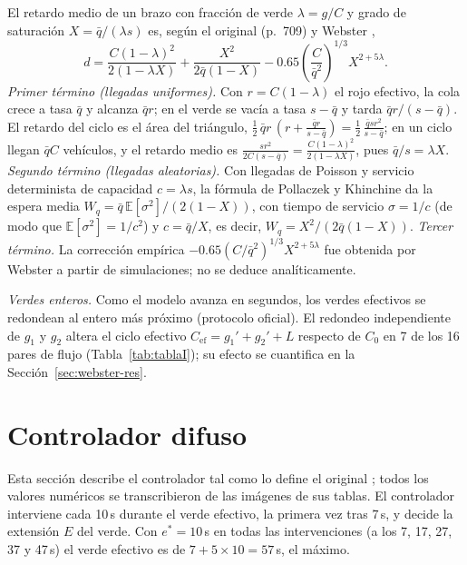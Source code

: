\documentclass[journal]{IEEEtran}
\newcommand{\qbar}{\bar{q}}   %
\begin{document}
El retardo medio de un brazo con fracción de verde $\lambda=g/C$ y grado de saturación $X=\qbar/(\lambda s)$ es, según el original (p.~709) y Webster \cite{Webster1958},
\begin{equation}
d=\frac{C(1-\lambda)^2}{2(1-\lambda X)}+\frac{X^2}{2\qbar(1-X)}-0.65\left(\frac{C}{\qbar^{2}}\right)^{1/3}X^{2+5\lambda}.
\label{eq:retardo-webster}
\end{equation}
\emph{Primer término (llegadas uniformes).} Con $r=C(1-\lambda)$ el rojo efectivo, la cola crece a tasa $\qbar$ y alcanza $\qbar r$; en el verde se vacía a tasa $s-\qbar$ y tarda $\qbar r/(s-\qbar)$. El retardo del ciclo es el área del triángulo, $\tfrac12\,\qbar r\,(r+\tfrac{\qbar r}{s-\qbar})=\tfrac12\,\tfrac{\qbar s r^2}{s-\qbar}$; en un ciclo llegan $\qbar C$ vehículos, y el retardo medio es $\frac{s r^2}{2C(s-\qbar)}=\frac{C(1-\lambda)^2}{2(1-\lambda X)}$, pues $\qbar/s=\lambda X$. \emph{Segundo término (llegadas aleatorias).} Con llegadas de Poisson y servicio determinista de capacidad $c=\lambda s$, la fórmula de Pollaczek y Khinchine da la espera media $W_q=\qbar\,\mathbb{E}[\sigma^2]/(2(1-X))$, con tiempo de servicio $\sigma=1/c$ (de modo que $\mathbb{E}[\sigma^2]=1/c^2$) y $c=\qbar/X$, es decir, $W_q=X^2/(2\qbar(1-X))$. \emph{Tercer término.} La corrección empírica $-0.65(C/\qbar^2)^{1/3}X^{2+5\lambda}$ fue obtenida por Webster a partir de simulaciones; no se deduce analíticamente.

\emph{Verdes enteros.} Como el modelo avanza en segundos, los verdes efectivos se redondean al entero más próximo (protocolo oficial). El redondeo independiente de $g_1$ y $g_2$ altera el ciclo efectivo $C_{\mathrm{ef}}=g_1'+g_2'+L$ respecto de $C_0$ en 7 de los 16 pares de flujo (Tabla~\ref{tab:tablaI}); su efecto se cuantifica en la Sección~\ref{sec:webster-res}.

\section{Controlador difuso}
\label{sec:controlador}

Esta sección describe el controlador tal como lo define el original \cite{Pappis1977}; todos los valores numéricos se transcribieron de las imágenes de sus tablas. El controlador interviene cada 10\,s durante el verde efectivo, la primera vez tras 7\,s, y decide la extensión $E$ del verde. Con $e^*=10$\,s en todas las intervenciones (a los 7, 17, 27, 37 y 47\,s) el verde efectivo es de $7+5\times10=57$\,s, el máximo.
\end{document}
